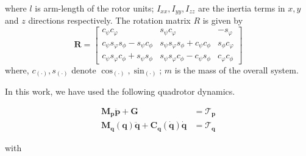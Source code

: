 where $l$ is arm-length of the rotor units; $I_{xx}, I_{yy},I_{zz}  $ are the inertia terms in $x,y$ and $z$ directions respectively. The rotation matrix $R$ is given by 
$$\mathbf{R} =\begin{bmatrix}
		c_\psi c_\varphi & s_\psi c_\varphi & -s_\varphi \\
		c_\psi s_\varphi s_\phi  - s_\psi c_\phi & s_\psi s_\varphi s_\phi  + c_\psi c_\phi & s_\phi  c_\varphi\\
		 c_\psi s_\varphi c_\phi + s_\psi s_\phi  &  s_\psi s_\varphi c_\phi - c_\psi s_\phi  & c_\varphi c_\phi
		\end{bmatrix}$$
where, $c_{(\cdot)},s_{(\cdot)}$ denote $\cos_{(\cdot)},\sin_{(\cdot)}$; $m$ is the mass of the overall system.

In this work, we have used the following quadrotor dynamics.

\begin{align} \label{el_pos}
   \mathbf{ M_p\ddot{p}} + \mathbf{G} &= \mathbf{\mathcal{T}_p}  \nonumber \\
    \mathbf{M_q(q)\ddot{q}} + \mathbf{C_q(\dot{q})\dot{q}} &= \mathbf{\mathcal{T}_q}
\end{align}

with

